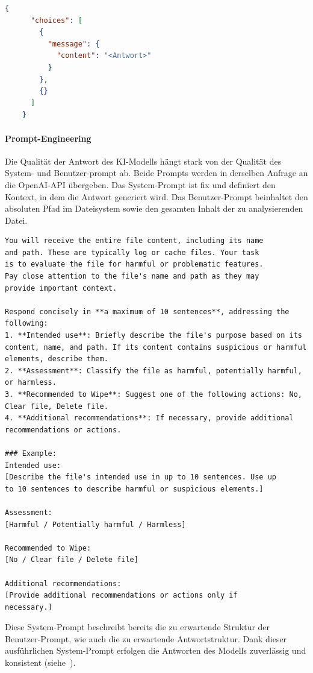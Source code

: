 \documentclass[a4paper,12pt]{report}
\begin{document}
    \begin{lstlisting}[language=json,caption={OpenAI Antwort},label={lst:openai-response}]
    {
      "choices": [
        {
          "message": {
            "content": "<Antwort>"
          }
        },
        {}
      ]
    }
    \end{lstlisting}

    \paragraph*{Prompt-Engineering}
    Die Qualität der Antwort des KI-Modells hängt stark von der Qualität des System- und Benutzer-\gls{prompt} ab.
    Beide Prompts werden in derselben Anfrage an die OpenAI-API übergeben.
    Das System-Prompt ist fix und definiert den Kontext, in dem die Antwort generiert wird.
    Das Benutzer-Prompt beinhaltet den absoluten Pfad im Dateisystem sowie den gesamten Inhalt der zu analysierenden Datei.

    \clearpage
    \begin{lstlisting}[label={lst:system-prompt}]
You will receive the entire file content, including its name
and path. These are typically log or cache files. Your task
is to evaluate the file for harmful or problematic features.
Pay close attention to the file's name and path as they may
provide important context.

Respond concisely in **a maximum of 10 sentences**, addressing the following:
1. **Intended use**: Briefly describe the file's purpose based on its content, name, and path. If its content contains suspicious or harmful elements, describe them.
2. **Assessment**: Classify the file as harmful, potentially harmful, or harmless.
3. **Recommended to Wipe**: Suggest one of the following actions: No, Clear file, Delete file.
4. **Additional recommendations**: If necessary, provide additional recommendations or actions.

### Example:
Intended use:
[Describe the file's intended use in up to 10 sentences. Use up
to 10 sentences to describe harmful or suspicious elements.]

Assessment:
[Harmful / Potentially harmful / Harmless]

Recommended to Wipe:
[No / Clear file / Delete file]

Additional recommendations:
[Provide additional recommendations or actions only if
necessary.]
    \end{lstlisting}
    Diese System-Prompt beschreibt bereits die zu erwartende Struktur der Benutzer-Prompt, wie auch die zu erwartende Antwortstruktur.
    Dank dieser ausführlichen System-Prompt erfolgen die Antworten des Modells zuverlässig und konsistent (siehe~).
\end{document}
